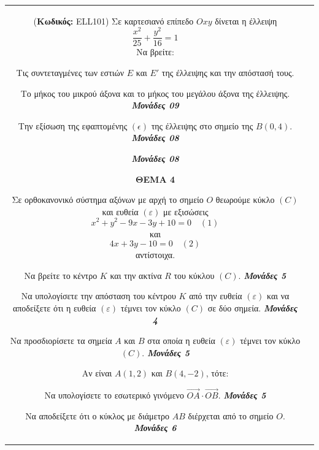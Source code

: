 \documentclass[11pt,a4paper,twoside]{book}
\newcounter{askhsh}[chapter]
\renewcommand{\theaskhsh}{
	\bf{\titlefont{\Large{\thechapter}}.\arabic{askhsh}}
}
\newcommand{\Askhsh}[2]{\refstepcounter{askhsh}{\vspace{4mm}\titlefont{{\large Άσκηση}\theaskhsh} - \textcolor{maincolor}{ΘEMA #2}} ({\small{\textbf{Κωδικός:} #1}})}{}
\newcommand{\monades}[1]{
\hspace*{\fill}
\textbf{\textit{\textcolor{maincolor}{Μονάδες #1}}}}
\begin{document}
\begin{tabular}{cc}
\vspace{4mm}

\Askhsh{ELL101}{2}
Σε καρτεσιανό επίπεδο $Oxy$ δίνεται η έλλειψη
\[
\frac{x^2}{25} + \frac{y^2}{16} = 1
\]
Να βρείτε:
\begin{alist}    \item Τις συντεταγμένες των εστιών $E$ και $E'$ της έλλειψης και την απόστασή τους.
    \item Το μήκος του μικρού άξονα και το μήκος του μεγάλου άξονα της έλλειψης.  \monades{09}
    \item Την εξίσωση της εφαπτομένης $(\epsilon)$ της έλλειψης στο σημείο της $B(0,4)$.  \monades{08}
 \monades{08}\end{alist}

\vspace{4mm}

\textbf{ΘΕΜΑ 4}

Σε ορθοκανονικό σύστημα αξόνων με αρχή το σημείο $O$ θεωρούμε κύκλο $(C)$ και ευθεία $(\varepsilon)$ με εξισώσεις
\[ x^2 + y^2 - 9x - 3y + 10 = 0 \quad (1) \]
και
\[ 4x + 3y - 10 = 0 \quad (2) \]
αντίστοιχα.

\begin{alist}    \item
    \begin{rlist}
        \item Να βρείτε το κέντρο $K$ και την ακτίνα $R$ του κύκλου $(C)$. \monades{5}
        \item Να υπολογίσετε την απόσταση του κέντρου $K$ από την ευθεία $(\varepsilon)$ και να αποδείξετε ότι η ευθεία $(\varepsilon)$ τέμνει τον κύκλο $(C)$ σε δύο σημεία. \monades{4}
        \item Να προσδιορίσετε τα σημεία $A$ και $B$ στα οποία η ευθεία $(\varepsilon)$ τέμνει τον κύκλο $(C)$. \monades{5}
    \end{rlist}
    \item Αν είναι $A(1,2)$ και $B(4, -2)$, τότε:
    \begin{rlist}
        \item Να υπολογίσετε το εσωτερικό γινόμενο $\vec{OA} \cdot \vec{OB}$. \monades{5}
        \item Να αποδείξετε ότι ο κύκλος με διάμετρο $AB$ διέρχεται από το σημείο $O$. \monades{6}
    \end{rlist}\end{alist}

\vspace{4mm}


\end{tabular}
\end{document}
